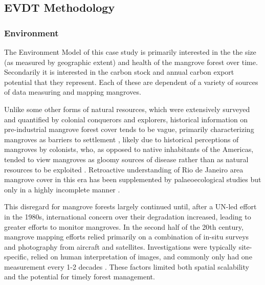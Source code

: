 \newpage

\subsection{EVDT Methodology} \label{sec:rio-evdt-method}

\subsubsection{Environment} \label{sec:rio-evdt-e-method}

The Environment Model of this case study is primarily interested in the the size (as measured by geographic extent) and health of the mangrove forest over time. Secondarily it is interested in the carbon stock and annual carbon export potential that they represent. Each of these are dependent of a variety of sources of data measuring and mapping mangroves.

Unlike some other forms of natural resources, which were extensively surveyed and quantified by colonial conquerors and explorers, historical information on pre-industrial mangrove forest cover tends to be vague, primarily characterizing mangroves as barriers to settlement \cite{amadorBaiaGuanabaraOcupacao2013}, likely due to historical perceptions of mangroves by colonists, who, as opposed to native inhabitants of the Americas, tended to view mangroves as gloomy sources of disease rather than as natural resources to be exploited \cite{friessEcosystemServicesDisservices2016}. Retroactive understanding of Rio de Janeiro area mangrove cover in this era has been supplemented by palaeoecological studies but only in a highly incomplete manner \cite{vilelaLateHoloceneEvolution2014}. 

This disregard for mangrove forests largely continued until, after a UN-led effort in the 1980s, international concern over their degradation increased, leading to greater efforts to monitor mangroves. In the second half of the 20th century, mangrove mapping efforts relied primarily on a combination of in-situ surveys and photography from aircraft and satellites. Investigations were typically site-specific, relied on human interpretation of images, and commonly only had one measurement every 1-2 decades \cite{lacerdaluizandmenezesmarceloandmussimolisanimauricioChangesMangroveExtension2007, fromardHalfCenturyDynamic2004}. These factors limited both spatial scalability and the potential for timely forest management. 

